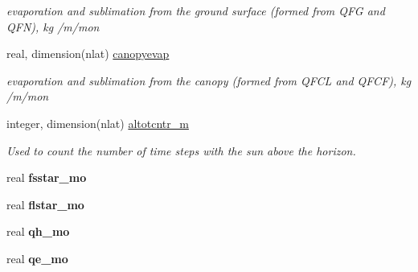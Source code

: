\begin{DoxyCompactItemize}
\begin{DoxyCompactList}\small\item\em evaporation and sublimation from the ground surface (formed from Q\+F\+G and Q\+F\+N), kg /m/mon \end{DoxyCompactList}\item 
\hypertarget{structctem__statevars_1_1class__moyr__output_a6c8a2d02d531bf12a7007c68a3b5fa39}{}real, dimension(nlat) \hyperlink{structctem__statevars_1_1class__moyr__output_a6c8a2d02d531bf12a7007c68a3b5fa39}{canopyevap}\label{structctem__statevars_1_1class__moyr__output_a6c8a2d02d531bf12a7007c68a3b5fa39}

\begin{DoxyCompactList}\small\item\em evaporation and sublimation from the canopy (formed from Q\+F\+C\+L and Q\+F\+C\+F), kg /m/mon \end{DoxyCompactList}\item 
\hypertarget{structctem__statevars_1_1class__moyr__output_a8842018d1a3cc2538ccf5e285b237fc2}{}integer, dimension(nlat) \hyperlink{structctem__statevars_1_1class__moyr__output_a8842018d1a3cc2538ccf5e285b237fc2}{altotcntr\+\_\+m}\label{structctem__statevars_1_1class__moyr__output_a8842018d1a3cc2538ccf5e285b237fc2}

\begin{DoxyCompactList}\small\item\em Used to count the number of time steps with the sun above the horizon. \end{DoxyCompactList}\item 
\hypertarget{structctem__statevars_1_1class__moyr__output_a778525103dcfd23a35e157482c7b4621}{}real {\bfseries fsstar\+\_\+mo}\label{structctem__statevars_1_1class__moyr__output_a778525103dcfd23a35e157482c7b4621}

\item 
\hypertarget{structctem__statevars_1_1class__moyr__output_adf85805abf59dcc217a1d7094fbbb5b1}{}real {\bfseries flstar\+\_\+mo}\label{structctem__statevars_1_1class__moyr__output_adf85805abf59dcc217a1d7094fbbb5b1}

\item 
\hypertarget{structctem__statevars_1_1class__moyr__output_ae2c30cee09903b5d41248e1febf1eb17}{}real {\bfseries qh\+\_\+mo}\label{structctem__statevars_1_1class__moyr__output_ae2c30cee09903b5d41248e1febf1eb17}

\item 
\hypertarget{structctem__statevars_1_1class__moyr__output_a73a2b36ed0b57abc37d444b6a7585d80}{}real {\bfseries qe\+\_\+mo}\label{structctem__statevars_1_1class__moyr__output_a73a2b36ed0b57abc37d444b6a7585d80}


\end{DoxyCompactItemize}
